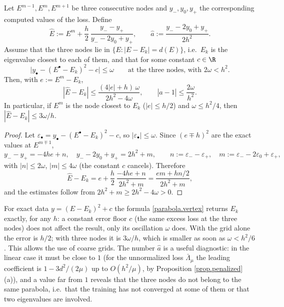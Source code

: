 \begin{proposition}\label{prop.parabola}
Let $E^{m-1},E^m,E^{m+1}$ be three consecutive nodes and $y_-,y_0,y_+$ the corresponding
computed values of the loss. Define
\begin{equation}\label{parabola.vertex}
\hat E:=E^m+\frac h2\,\frac{y_--y_+}{y_--2y_0+y_+},\qquad
\hat a:=\frac{y_--2y_0+y_+}{2h^2}.
\end{equation}
Assume that the three nodes lie in $\{E\colon|E-E_k|=d(E)\}$, i.e.\ $E_k$ is the
eigenvalue closest to each of them, and that for some constant $c\in\R$
\[
\big|y_\bullet-(E^{\bullet}-E_k)^2-c\big|\le\omega\qquad\text{at the three nodes, with } 2\omega<h^2 .
\]
Then, with $e:=E^m-E_k$,
\[
|\hat E-E_k|\le\frac{(4|e|+h)\,\omega}{2h^2-4\omega},\qquad|\hat a-1|\le\frac{2\omega}{h^2}.
\]
In particular, if $E^m$ is the node closest to $E_k$ ($|e|\le h/2$) and
$\omega\le h^2/4$, then $|\hat E-E_k|\le3\omega/h$.
\end{proposition}

\begin{proof}
Let $\varepsilon_\bullet=y_\bullet-(E^\bullet-E_k)^2-c$, so $|\varepsilon_\bullet|\le\omega$.
Since $(e\mp h)^2$ are the exact values at $E^{m\mp1}$,
\[
y_--y_+=-4he+n,\quad y_--2y_0+y_+=2h^2+m,\qquad
n:=\varepsilon_--\varepsilon_+,\quad m:=\varepsilon_--2\varepsilon_0+\varepsilon_+,
\]
with $|n|\le2\omega$, $|m|\le4\omega$ (the constant $c$ cancels). Therefore
\[
\hat E-E_k=e+\frac h2\,\frac{-4he+n}{2h^2+m}=\frac{em+hn/2}{2h^2+m},
\]
and the estimates follow from $2h^2+m\ge2h^2-4\omega>0$.
\end{proof}

\begin{remark}\label{rem.parabola}
For exact data $y=(E-E_k)^2+c$ the formula \eqref{parabola.vertex} returns $E_k$ exactly,
for any $h$: a constant error floor $c$ (the same excess loss at the three nodes) does
not affect the result, only its oscillation $\omega$ does. With the grid alone the error
is $h/2$; with three nodes it is $3\omega/h$, which is smaller as soon as
$\omega<h^2/6$. This allows the use of coarse grids. The number $\hat a$ is a useful
diagnostic: in the linear case it must be close to $1$ (for the unnormalized loss
$\bar\Lambda_\mu$ the leading coefficient is $1-3d^2/(2\mu)$ up to $O(h^2/\mu)$, by
Proposition \ref{prop.penalized}(a)), and a value far from $1$ reveals that the three nodes do not belong to the same parabola, i.e.\ that the
training has not converged at some of them or that two eigenvalues are involved.
\end{remark}


